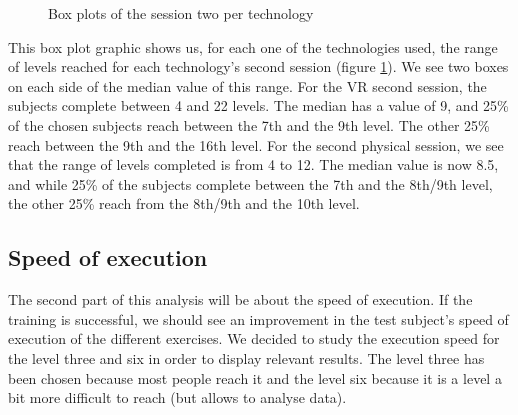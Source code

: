 \documentclass[12pt, openany, twocolumn]{article}
\begin{document}
                \begin{figure}[H]
                    \centering
                    \setlength{\fboxsep}{0pt}
                    \caption{Box plots of the session two per technology}
                    \label{figure18}
                \end{figure}

            This box plot graphic shows us, for each one of the technologies used, the range of levels reached for each technology's second session (figure \ref{figure18}). We see two boxes on each side of the median value of this range.
            For the VR second session, the subjects complete between 4 and 22 levels. The median has a value of 9, and 25\% of the chosen subjects reach between the 7th and the 9th level. The other 25\% reach between the 9th and the 16th level.
            For the second physical session, we see that the range of levels completed is from 4 to 12. The median value is now 8.5, and while 25\% of the subjects complete between the 7th and the 8th/9th level, the other 25\% reach from the 8th/9th and the 10th level.

    \subsection{Speed of execution}
    The second part of this analysis will be about the speed of execution.
    If the training is successful, we should see an improvement in the test subject's speed of execution of the different exercises. We decided to study the execution speed for the level three and six in order to display relevant results. The level three has been chosen because most people reach it and the level six because it is a level a bit more difficult to reach (but allows to analyse data). 
\end{document}
